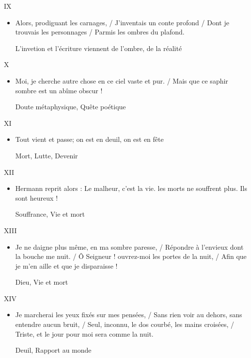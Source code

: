 \documentclass[french,a4paper,11pt,answers]{exam}
\newcommand{\cit}[2]{\og #1 \fg{} \begin{solution}{ #2 }\end{solution}} %
\begin{document}
	\begin{cadre}{IX}
		\begin{itemize}
			\item \cit{Alors, prodiguant les carnages, / J'inventais un conte profond / Dont je trouvais les personnages / Parmis les ombres du plafond.}
				{L'invetion et l'écriture viennent de l'ombre, de la réalité}
		\end{itemize}
	\end{cadre}
	
	\begin{cadre}{X}
		\begin{itemize}
			\item \cit{Moi, je cherche autre chose en ce ciel vaste et pur. / Mais que ce saphir sombre est un abîme obscur !}
				{Doute métaphysique, Quête poétique}
		\end{itemize}
	\end{cadre}
	
	\begin{cadre}{XI}
		\begin{itemize}
			\item \cit{Tout vient et passe; on est en deuil, on est en fête}
				{Mort, Lutte, Devenir}
		\end{itemize}
	\end{cadre}
	
	\begin{cadre}{XII}
		\begin{itemize}
			\item \cit{Hermann reprit alors : \og Le malheur, c'est la vie. les morts ne souffrent plus. Ils sont heureux ! \fg}
				{Souffrance, Vie et mort}
		\end{itemize}
	\end{cadre}
	
	\begin{cadre}{XIII}
		\begin{itemize}
			\item \cit{Je ne daigne plus même, en ma sombre paresse, / Répondre à l'envieux dont la bouche me nuit. / Ô Seigneur ! ouvrez-moi les portes de la nuit, / Afin que je m'en aille et que je disparaisse !}
				{Dieu, Vie et mort}
		\end{itemize}
	\end{cadre}
	
	\begin{cadre}{XIV}
		\begin{itemize}
			\item \cit{Je marcherai les yeux fixés sur mes pensées, / Sans rien voir au dehors, sans entendre aucun bruit, / Seul, inconnu, le dos courbé, les mains croisées, / Triste, et le jour pour moi sera comme la nuit.}
				{Deuil, Rapport au monde}
		\end{itemize}
	\end{cadre}
	
\end{document}

